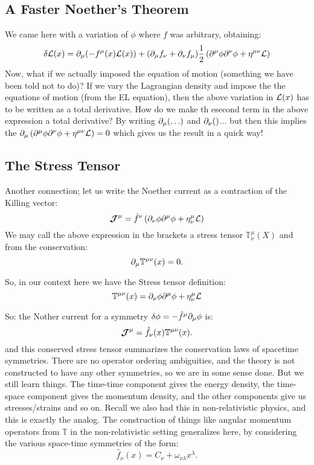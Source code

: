\subsection{A Faster Noether's Theorem}
We came here with a variation of $\phi$ where $f$ was arbitrary, obtaining:
\begin{equation}
    \delta \L(x) = \p_\mu (-f^\mu(x)\L(x)) + (\p_\mu f_\nu + \p_\nu f_\mu)\frac{1}{2}\left(\p^\mu \varphi \p^\nu \varphi + \eta^{\mu\nu}\L\right)
\end{equation}
Now, what if we actually imposed the equation of motion (something we have been told not to do)? If we vary the Lagrangian density and impose the the equations of motion (from the EL equation), then the above variation in $\mathcal{L}(x)$ has to be written as a total derivative. How do we make th esecond term in the above expression a total derivative? By writing $\partial_\mu(\ldots)$ and $\partial_\nu()$... but then this implies the $\p_\mu\left(\p^\mu \varphi \p^\nu \varphi + \eta^{\mu\nu}\L\right) = 0$ which gives us the result in a quick way! 

\subsection{The Stress Tensor}
Another connection; let us write the Noether current as a contraction of the Killing vector:
\begin{equation}
    \gv{\mathcal{J}}^\mu = \hat{f}^\nu \left(\p_\nu \phi \p^\mu \phi  + \eta_{\nu}^\mu \L\right)
\end{equation}
We may call the above expression in the brackets a stress tensor $\mathbb{T}_{\nu}^\mu(X)$ and from the conservation:
\begin{equation}
    \partial_\mu \mathbb{T}^{\mu\nu}(x) = 0.
\end{equation} 

So, in our context here we have the Stress tensor definition:
\begin{equation}
    \mathbb{T}^{\mu\nu}(x) = \p_\nu \phi \p^\mu \phi  + \eta_{\nu}^\mu \L
\end{equation}

So: the Nother current for a symmetry $\delta \phi = -\hat{f}^\mu \p_\mu \phi$  is:
\begin{equation}
    \mbox{\boldmath$ \mathcal{J} $}^\mu = \hat{f}_\nu (x) \mathbb{T}^{\mu\nu}(x).
\end{equation}
and this conserved stress tensor summarizes the conservation laws of spacetime symmetries. There are no operator ordering ambiguities, and the theory is not constructed to have any other symmetries, so we are in some sense done. But we still learn things. The time-time component gives the energy density, the time-space component gives the momentum density, and the other components give us stresses/strains and so on. Recall we also had this in non-relativistic physics, and this is exactly the analog. The construction of things like angular momentum operators from $\mathbb{T}$ in the non-relativistic setting generalizes here, by considering the various space-time symmetries of the form:
\begin{equation}
    \hat{f}_\nu(x) = C_\nu + \omega_{\nu\lambda}x^\lambda.
\end{equation}

